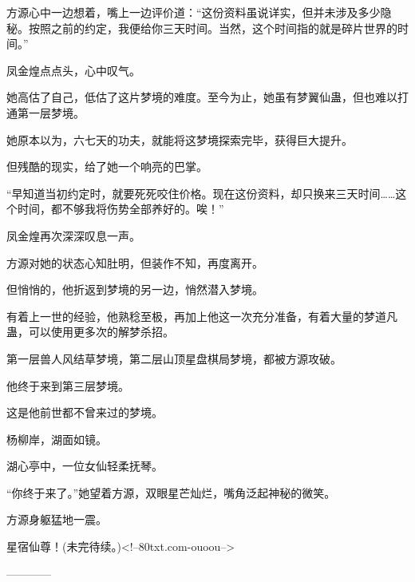 \begin{this_body}
方源心中一边想着，嘴上一边评价道：“这份资料虽说详实，但并未涉及多少隐秘。按照之前的约定，我便给你三天时间。当然，这个时间指的就是碎片世界的时间。”

凤金煌点点头，心中叹气。

她高估了自己，低估了这片梦境的难度。至今为止，她虽有梦翼仙蛊，但也难以打通第一层梦境。

她原本以为，六七天的功夫，就能将这梦境探索完毕，获得巨大提升。

但残酷的现实，给了她一个响亮的巴掌。

“早知道当初约定时，就要死死咬住价格。现在这份资料，却只换来三天时间……这个时间，都不够我将伤势全部养好的。唉！”

凤金煌再次深深叹息一声。

方源对她的状态心知肚明，但装作不知，再度离开。

但悄悄的，他折返到梦境的另一边，悄然潜入梦境。

有着上一世的经验，他熟稔至极，再加上他这一次充分准备，有着大量的梦道凡蛊，可以使用更多次的解梦杀招。

第一层兽人风结草梦境，第二层山顶星盘棋局梦境，都被方源攻破。

他终于来到第三层梦境。

这是他前世都不曾来过的梦境。

杨柳岸，湖面如镜。

湖心亭中，一位女仙轻柔抚琴。

“你终于来了。”她望着方源，双眼星芒灿烂，嘴角泛起神秘的微笑。

方源身躯猛地一震。

星宿仙尊！(未完待续。)<!--80txt.com-ouoou-->

------------

\end{this_body}

